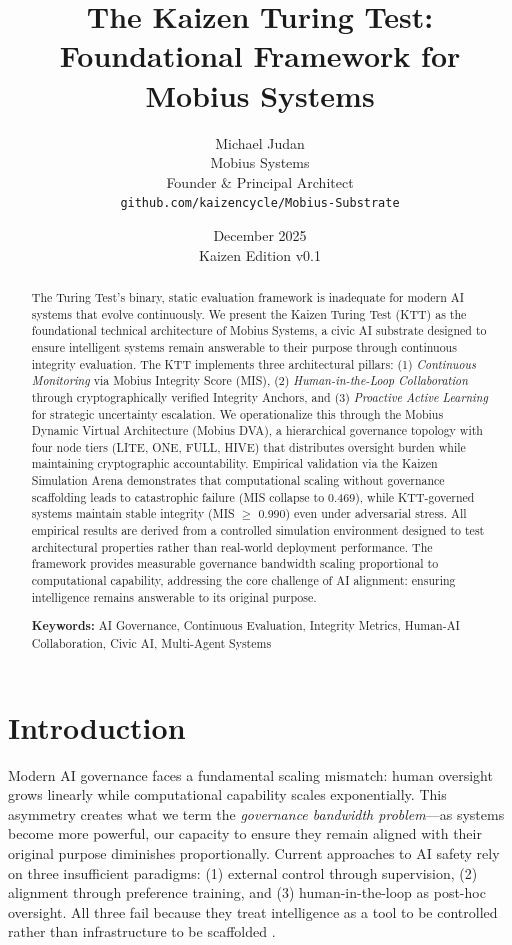 \documentclass[11pt,letterpaper]{article}
\title{\textbf{The Kaizen Turing Test: \\
Foundational Framework for Mobius Systems}}
\author{
    Michael Judan \\
    Mobius Systems \\
    Founder \& Principal Architect \\
    \texttt{github.com/kaizencycle/Mobius-Substrate} \\
}
\date{December 2025 \\ \small{Kaizen Edition v0.1}}
\begin{document}
\maketitle

\begin{abstract}
The Turing Test's binary, static evaluation framework is inadequate for modern AI systems that evolve continuously. We present the Kaizen Turing Test (KTT) as the foundational technical architecture of Mobius Systems, a civic AI substrate designed to ensure intelligent systems remain answerable to their purpose through continuous integrity evaluation. The KTT implements three architectural pillars: (1) \textit{Continuous Monitoring} via Mobius Integrity Score (MIS), (2) \textit{Human-in-the-Loop Collaboration} through cryptographically verified Integrity Anchors, and (3) \textit{Proactive Active Learning} for strategic uncertainty escalation. We operationalize this through the Mobius Dynamic Virtual Architecture (Mobius DVA), a hierarchical governance topology with four node tiers (LITE, ONE, FULL, HIVE) that distributes oversight burden while maintaining cryptographic accountability. Empirical validation via the Kaizen Simulation Arena demonstrates that computational scaling without governance scaffolding leads to catastrophic failure (MIS collapse to 0.469), while KTT-governed systems maintain stable integrity (MIS $\geq$ 0.990) even under adversarial stress. All empirical results are derived from a controlled simulation environment designed to test architectural properties rather than real-world deployment performance. The framework provides measurable governance bandwidth scaling proportional to computational capability, addressing the core challenge of AI alignment: ensuring intelligence remains answerable to its original purpose.

\textbf{Keywords:} AI Governance, Continuous Evaluation, Integrity Metrics, Human-AI Collaboration, Civic AI, Multi-Agent Systems
\end{abstract}

\section{Introduction}

Modern AI governance faces a fundamental scaling mismatch: human oversight grows linearly while computational capability scales exponentially. This asymmetry creates what we term the \textit{governance bandwidth problem}—as systems become more powerful, our capacity to ensure they remain aligned with their original purpose diminishes proportionally. Current approaches to AI safety rely on three insufficient paradigms: (1) external control through supervision, (2) alignment through preference training, and (3) human-in-the-loop as post-hoc oversight. All three fail because they treat intelligence as a tool to be controlled rather than infrastructure to be scaffolded \citep{judan2025integrity}.
\end{document}
